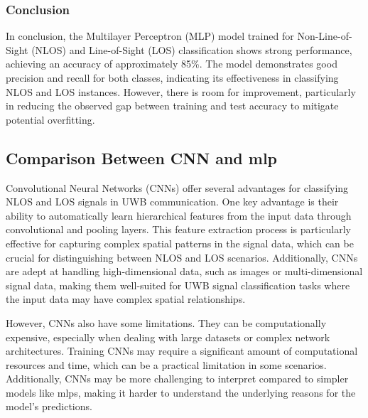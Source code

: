 \subsubsection{Conclusion}

In conclusion, the Multilayer Perceptron (MLP) model trained for Non-Line-of-Sight (NLOS) and Line-of-Sight (LOS) classification shows strong performance, achieving an accuracy of approximately 85\%. The model demonstrates good precision and recall for both classes, indicating its effectiveness in classifying NLOS and LOS instances. However, there is room for improvement, particularly in reducing the observed gap between training and test accuracy to mitigate potential overfitting.

\subsection{Comparison Between CNN and \acrshort{mlp}}\label{cnn_vs_mlp}


Convolutional Neural Networks (CNNs) offer several advantages for classifying NLOS and LOS signals in UWB communication. One key advantage is their ability to automatically learn hierarchical features from the input data through convolutional and pooling layers. This feature extraction process is particularly effective for capturing complex spatial patterns in the signal data, which can be crucial for distinguishing between NLOS and LOS scenarios. Additionally, CNNs are adept at handling high-dimensional data, such as images or multi-dimensional signal data, making them well-suited for UWB signal classification tasks where the input data may have complex spatial relationships.

However, CNNs also have some limitations. They can be computationally expensive, especially when dealing with large datasets or complex network architectures. Training CNNs may require a significant amount of computational resources and time, which can be a practical limitation in some scenarios. Additionally, CNNs may be more challenging to interpret compared to simpler models like \acrshort{mlp}s, making it harder to understand the underlying reasons for the model's predictions.

